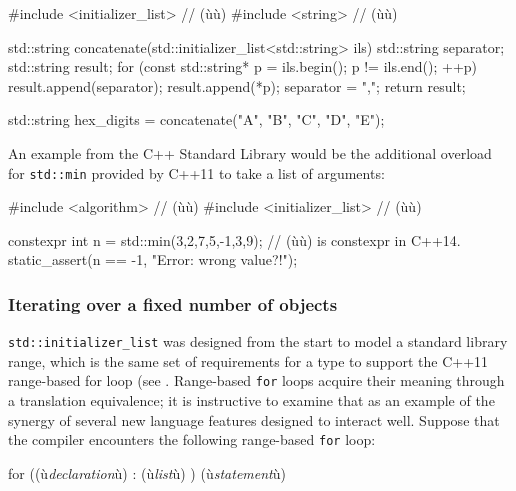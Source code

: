 \begin{emcppslisting}
#include <initializer_list>  // (ù{}ù)
#include <string>            // (ù{}ù)

std::string concatenate(std::initializer_list<std::string> ils)
{
    std::string separator;
    std::string result;
    for (const std::string* p = ils.begin(); p != ils.end(); ++p)
    {
        result.append(separator);
        result.append(*p);
        separator = ",";
    }
    return result;
}

std::string hex_digits = concatenate({"A", "B", "C", "D", "E"});
\end{emcppslisting}
    

\noindent An example from the C++ Standard Library would be the additional
overload for \lstinline!std::min! provided by C++11 to take a list of
arguments:

\begin{emcppslisting}[emcppsstandards={c++14}]
#include <algorithm>         // (ù{}ù)
#include <initializer_list>  // (ù{}ù)

constexpr int n = std::min({3,2,7,5,-1,3,9});  // (ù{}ù) is constexpr in C++14.
static_assert(n == -1, "Error: wrong value?!");
\end{emcppslisting}
    

\subsubsection[Iterating over a fixed number of objects]{Iterating over a fixed number of objects}\label{iterating-over-a-fixed-number-of-objects}

\lstinline!std::initializer_list! was designed from the start to model a
standard library range, which is the same set of requirements for a type
to support the C++11 range-based for loop (see .
Range-based \lstinline!for! loops acquire their meaning through a
translation equivalence; it is instructive to examine that as an example
of the synergy of several new language features designed to interact
well. Suppose that the compiler encounters the following range-based
\lstinline!for! loop:

\begin{emcppslisting}[emcppsignore={pseudocode}]
for ((ù{\emph{declaration}}ù) : { (ù{\emph{list}}ù) }) (ù{\emph{statement}}ù)
\end{emcppslisting}
    


